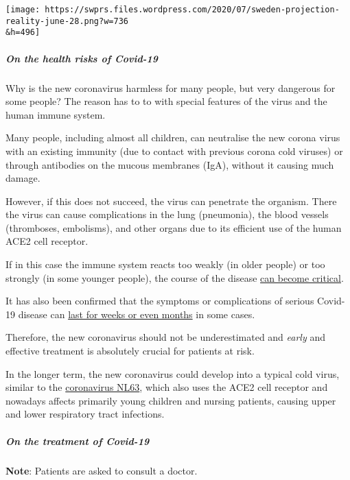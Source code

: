 \texttt{[image: https://swprs.files.wordpress.com/2020/07/sweden-projection-reality-june-28.png?w=736\\\&h=496]}

\hypertarget{on-the-health-risks-of-covid-19}{%
\subparagraph{\texorpdfstring{\textbf{On the health risks of
Covid-19}}{On the health risks of Covid-19}}\label{on-the-health-risks-of-covid-19}}

Why is the new coronavirus harmless for many people, but very dangerous
for some people? The reason has to to with special features of the virus
and the human immune system.

Many people, including almost all children, can neutralise the new
corona virus with an existing immunity (due to contact with previous
corona cold viruses) or through antibodies on the mucous membranes
(IgA), without it causing much damage.

However, if this does not succeed, the virus can penetrate the organism.
There the virus can cause complications in the lung (pneumonia), the
blood vessels (thromboses, embolisms), and other organs due to its
efficient use of the human ACE2 cell receptor.

If in this case the immune system reacts too weakly (in older people) or
too strongly (in some younger people), the course of the disease
\href{https://www.hollywoodreporter.com/news/nick-cordero-dead-bullets-broadway-waitress-actor-was-41-1301841}{can
become critical}.

It has also been confirmed that the symptoms or complications of serious
Covid-19 disease can
\href{https://www.theatlantic.com/health/archive/2020/06/covid-19-coronavirus-longterm-symptoms-months/612679/}{last
for weeks or even months} in some cases.

Therefore, the new coronavirus should not be underestimated and
\emph{early} and effective treatment is absolutely crucial for patients
at risk.

In the longer term, the new coronavirus could develop into a typical
cold virus, similar to the
\href{https://en.wikipedia.org/wiki/Human_coronavirus_NL63}{coronavirus
NL63}, which also uses the ACE2 cell receptor and nowadays affects
primarily young children and nursing patients, causing upper and lower
respiratory tract infections.

\hypertarget{on-the-treatment-of-covid-19-1}{%
\subparagraph{\texorpdfstring{\textbf{On the treatment of
Covid-19}}{On the treatment of Covid-19}}\label{on-the-treatment-of-covid-19-1}}

\textbf{Note}: Patients are asked to consult a doctor.


